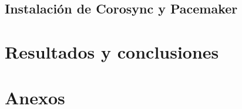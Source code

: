 \documentclass[12pt,a4paper,titlepage,twoside]{report}
\begin{document}
\section{Instalación de Corosync y Pacemaker}


\chapter{Resultados y conclusiones}
\chapter{Anexos}

\nocite{*}
\end{document}
